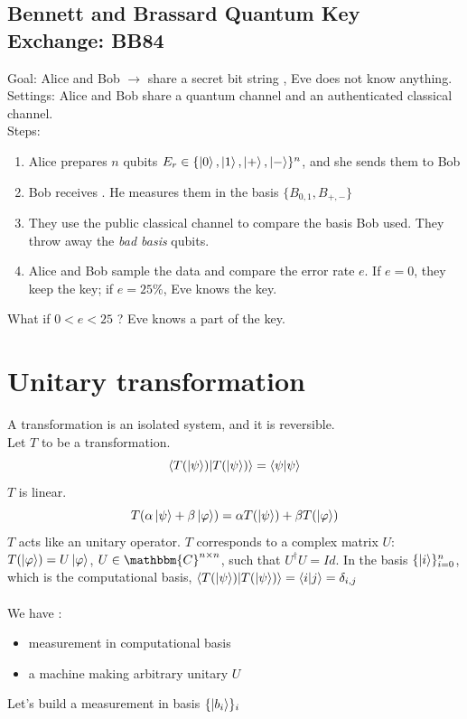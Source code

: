 \documentclass{article}
\begin{document}
\subsection{Bennett and Brassard Quantum Key Exchange: BB84}
Goal: Alice and Bob $\rightarrow$ share a secret bit string , Eve does not know
anything. \\
Settings: Alice and Bob share a quantum channel and an authenticated classical
channel. \\\noindent Steps:
\begin{enumerate}
    \item Alice prepares $n$ qubits $E_r \in \{\ket{0}, \ket{1}, \ket{+},
    \ket{-}\}^n$, and she sends them to Bob
    \item Bob receives . He measures them in the basis $\{B_{0,1}, B_{+,-}\}$
    \item They use the public classical channel to compare the basis Bob used.
    They throw away the \textit{bad basis} qubits.
    \item Alice and Bob sample the data and compare the error rate $e$. If
        $e=0$, they keep the key; if $e = 25\%$, Eve knows the key.
\end{enumerate}
What if $0 < e < 25$ ? Eve knows a part of the key.
\section{Unitary transformation}
A transformation is an isolated system, and it is reversible. \\
Let $T$ to be a transformation.
\begin{equation}
    \braket{T(\ket{\psi})|T(\ket{\psi})}=\braket{\psi|\psi}
\end{equation}
$T$ is linear.
\begin{equation}
    T(\alpha\ket{\psi} + \beta\ket{\varphi}) = \alpha T(\ket{\psi}) + \beta T(\ket{\varphi})
\end{equation}
$T$ acts like an unitary operator. $T$ corresponds to a complex matrix $U$:
$T(\ket{\varphi}) = U\ket{\varphi}$, $U \in \mathbbm{C}^{n \times n}$, such that
$U^\dagger U= Id$.
In the basis $\{\ket{i}\}_{i=0}^n$, which is the computational basis,
$\braket{T(\ket{\psi})|T(\ket{\psi})} = \braket{i|j} = \delta_{i,j}$
\\
\\
We have :
\begin{itemize}[label=-]
    \item measurement in computational basis
    \item a machine making arbitrary unitary $U$
\end{itemize}
Let's build a measurement in basis $\{\ket{b_i}\}_i$
\end{document}

